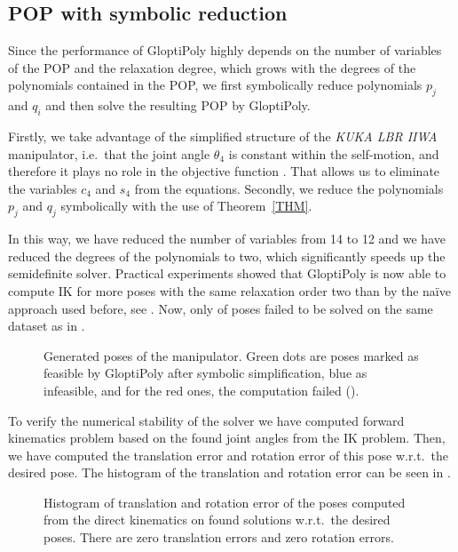 \subsection{POP with symbolic reduction}
Since the performance of GloptiPoly highly depends on the number of variables of the POP and the relaxation degree, which grows with the degrees of the polynomials contained in the POP, we first symbolically reduce polynomials $p_j$ and $q_i$ and then solve the resulting POP by GloptiPoly.

Firstly, we take advantage of the simplified structure of the \textit{KUKA LBR IIWA} manipulator, i.e.\ that the joint angle $\theta_4$ is constant within the self-motion, and therefore it plays no role in the objective function . That allows us to eliminate the variables $c_4$ and $s_4$ from the equations. Secondly, we reduce the polynomials $p_j$ and $q_j$ symbolically with the use of Theorem~\ref{THM}.

In this way, we have reduced the number of variables from 14 to 12 and we have reduced the degrees of the polynomials to two, which significantly speeds up the semidefinite solver. Practical experiments showed that GloptiPoly is now able to compute IK for more poses with the same relaxation order two than by the na\"ive approach used before, see . Now, only \GBFailed{} of poses failed to be solved on the same dataset as in .

\begin{figure}[ht]
  \centering
  \resizebox{0.75\textwidth}{!}{
    
  }
  \caption{Generated poses of the manipulator. Green dots are poses marked as feasible by GloptiPoly after symbolic simplification, blue as infeasible, and for the red ones, the computation failed (\GBFailed).}
\end{figure}

To verify the numerical stability of the solver we have computed forward kinematics problem based on the found joint angles from the IK problem. Then, we have computed the translation error and rotation error of this pose w.r.t.\ the desired pose. The histogram of the translation and rotation error can be seen in .

\begin{figure}[ht]
  \resizebox{\textwidth}{!}{
    
  }
  \caption{Histogram of translation and rotation error of the poses computed from the direct kinematics on found solutions w.r.t.\ the desired poses. There are \GBZeroErrorsT{} zero translation errors and \GBZeroErrorsR{} zero rotation errors.}
\end{figure}

